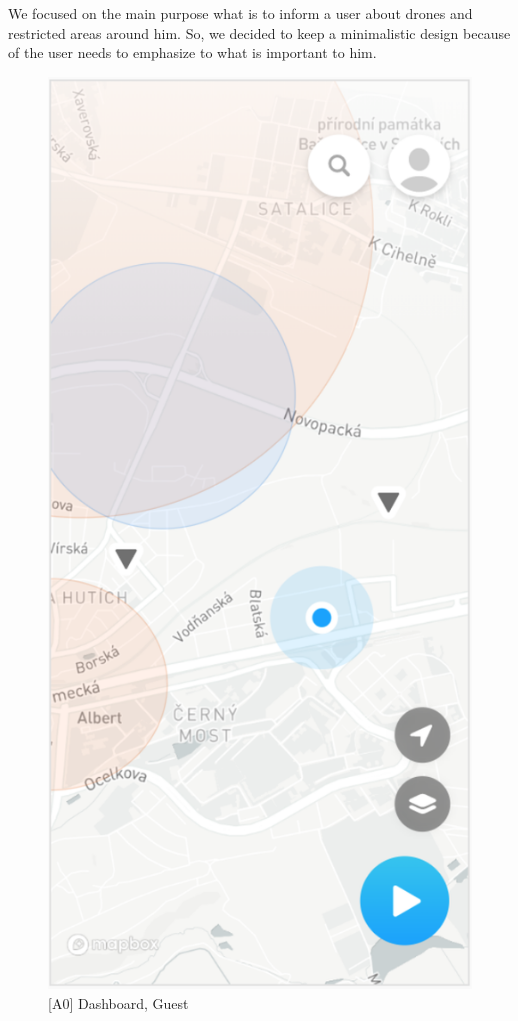 We focused on the main purpose what is to inform a user about drones and restricted areas around him.
So, we decided to keep a minimalistic design because of the user needs to emphasize to what is important to him.


\begin{figure}
    \centering
    \begin{minipage}{.45\textwidth}
        \centering
        \includegraphics[width=.7\linewidth]{assets/user_interface_design/dashboard/dashboard_guest.png}
        \caption{[A0] Dashboard, Guest}
        \label{fig:dashboard_guest}
    \end{minipage}%
    \hspace{.05\linewidth}
    \begin{minipage}{.45\textwidth}
        \centering

\end{minipage}
\end{figure}
